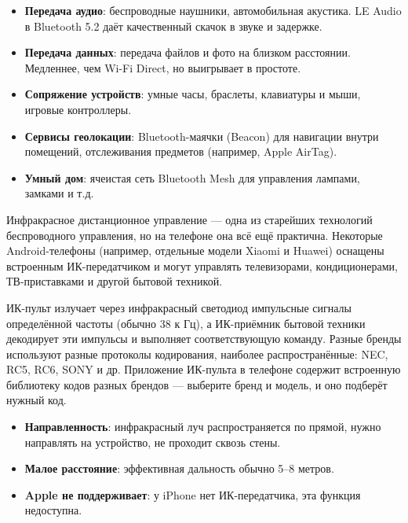 \begin{itemize}
  \item \textbf{Передача аудио}: беспроводные наушники, автомобильная акустика. LE Audio в Bluetooth 5.2 даёт качественный скачок в звуке и задержке.
  \item \textbf{Передача данных}: передача файлов и фото на близком расстоянии. Медленнее, чем Wi-Fi Direct, но выигрывает в простоте.
  \item \textbf{Сопряжение устройств}: умные часы, браслеты, клавиатуры и мыши, игровые контроллеры.
  \item \textbf{Сервисы геолокации}: Bluetooth-маячки (Beacon) для навигации внутри помещений, отслеживания предметов (например, Apple AirTag).
  \item \textbf{Умный дом}: ячеистая сеть Bluetooth Mesh для управления лампами, замками и т.д.
\end{itemize}


Инфракрасное дистанционное управление — одна из старейших технологий беспроводного управления, но на телефоне она всё ещё практична. Некоторые Android-телефоны (например, отдельные модели Xiaomi и Huawei) оснащены встроенным ИК-передатчиком и могут управлять телевизорами, кондиционерами, ТВ-приставками и другой бытовой техникой.


ИК-пульт излучает через инфракрасный светодиод импульсные сигналы определённой частоты (обычно 38 к Гц), а ИК-приёмник бытовой техники декодирует эти импульсы и выполняет соответствующую команду. Разные бренды используют разные протоколы кодирования, наиболее распространённые: NEC, RC5, RC6, SONY и др. Приложение ИК-пульта в телефоне содержит встроенную библиотеку кодов разных брендов — выберите бренд и модель, и оно подберёт нужный код.


\begin{itemize}
  \item \textbf{Направленность}: инфракрасный луч распространяется по прямой, нужно направлять на устройство, не проходит сквозь стены.
  \item \textbf{Малое расстояние}: эффективная дальность обычно 5–8 метров.
  \item \textbf{Apple не поддерживает}: у iPhone нет ИК-передатчика, эта функция недоступна.
\end{itemize}

